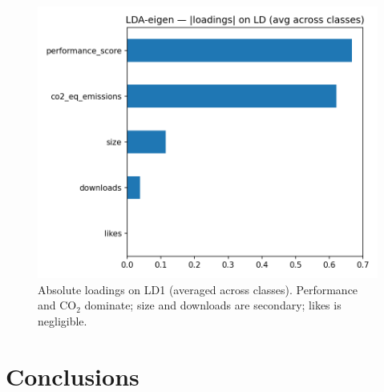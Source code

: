 \documentclass[journal]{IEEEtran}
\begin{document}
\begin{figure}[t]
	\centering
	\includegraphics[width=.72\linewidth]{assets/LDA-eigen_loadings_abs_bar.png}
	\caption{Absolute loadings on LD1 (averaged across classes). Performance and CO$_2$ dominate; size and downloads are secondary; likes is negligible.}
	\label{fig:lda-loadings}
\end{figure}



	\section{Conclusions}
	\label{sec:conclusion}


	

	
\end{document}
